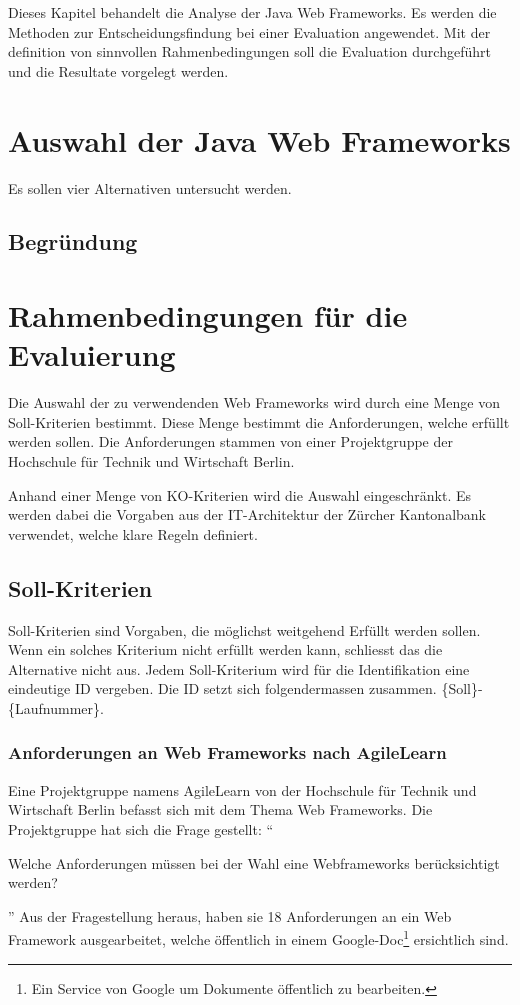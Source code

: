   Dieses Kapitel behandelt die Analyse der Java Web Frameworks. Es werden die
  Methoden zur Entscheidungsfindung bei einer Evaluation angewendet. Mit der
  definition von sinnvollen Rahmenbedingungen soll die Evaluation durchgeführt
  und die Resultate vorgelegt werden.
  
  \section{Auswahl der Java Web Frameworks}
  
  Es sollen vier Alternativen untersucht werden.
  
  \subsection{Begründung}
    
  \section{Rahmenbedingungen für die Evaluierung}
  
  Die Auswahl der zu verwendenden Web Frameworks wird durch eine Menge von
  Soll-Kriterien bestimmt. Diese Menge bestimmt die Anforderungen, welche
  erfüllt werden sollen. Die Anforderungen stammen von einer Projektgruppe der
  Hochschule für Technik und Wirtschaft Berlin.
  
  Anhand einer Menge von KO-Kriterien wird die Auswahl eingeschränkt. Es werden
  dabei die Vorgaben aus der IT-Architektur der Zürcher Kantonalbank verwendet,
  welche klare Regeln definiert.

  \subsection{Soll-Kriterien}
  
  Soll-Kriterien sind Vorgaben, die möglichst weitgehend Erfüllt werden sollen.
  Wenn ein solches Kriterium nicht erfüllt werden kann, schliesst das die
  Alternative nicht aus. Jedem Soll-Kriterium wird für die Identifikation eine
  eindeutige ID vergeben. Die ID setzt sich folgendermassen zusammen.
  \{Soll\}-\{Laufnummer\}.
  
  \subsubsection{Anforderungen an Web Frameworks nach AgileLearn}
  
  Eine Projektgruppe namens AgileLearn von der Hochschule für Technik und
  Wirtschaft Berlin befasst sich mit dem Thema Web Frameworks. Die
  Projektgruppe hat sich die Frage gestellt: ``\begin{itshape}Welche
  Anforderungen müssen bei der Wahl eine Webframeworks berücksichtigt
  werden?\end{itshape}'' Aus der Fragestellung heraus, haben sie 18
  Anforderungen an ein Web Framework ausgearbeitet, welche öffentlich in einem
  Google-Doc\footnote{Ein Service von Google um Dokumente öffentlich zu
  bearbeiten.} ersichtlich sind.
  

